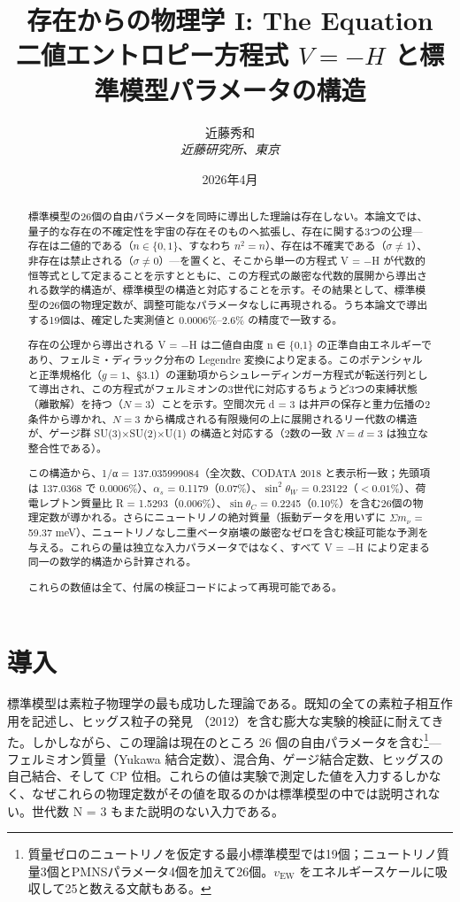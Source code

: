 \documentclass[fontsize=11pt,paper=a4,lualatex]{jlreq}
\title{\textbf{存在からの物理学 I: The Equation}\\[0.45em]{\large 二値エントロピー方程式 $V = -H$ と標準模型パラメータの構造}}
\author{近藤秀和\\[0.5em]\small\textit{近藤研究所、東京}}
\date{2026年4月}
\begin{document}
\maketitle
\begin{abstract}\sloppy\noindent\label{ux6982ux8981}

標準模型の26個の自由パラメータを同時に導出した理論は存在しない。本論文では、量子的な存在の不確定性を宇宙の存在そのものへ拡張し、存在に関する3つの公理---存在は二値的である（$n \in \{0,1\}$、すなわち $n^2{=}n$）、存在は不確実である（$\sigma \neq 1$）、非存在は禁止される（$\sigma \neq 0$）---を置くと、そこから単一の方程式 V = −H が代数的恒等式として定まることを示すとともに、この方程式の厳密な代数的展開から導出される数学的構造が、標準模型の構造と対応することを示す。その結果として、標準模型の26個の物理定数が、調整可能なパラメータなしに再現される。うち本論文で導出する19個は、確定した実測値と 0.0006\%--2.6\% の精度で一致する。

存在の公理から導出される V = −H は二値自由度 n ∈ \{0,1\}
の正準自由エネルギーであり、フェルミ・ディラック分布の Legendre
変換により定まる。このポテンシャルと正準規格化（$g = 1$、\S3.1）の運動項からシュレーディンガー方程式が転送行列として導出され、この方程式がフェルミオンの3世代に対応するちょうど3つの束縛状態（離散解）を持つ（$N = 3$）ことを示す。空間次元
d = 3
は井戸の保存と重力伝播の2条件から導かれ、$N = 3$ から構成される有限幾何の上に展開されるリー代数の構造が、ゲージ群
SU(3)×SU(2)×U(1) の構造と対応する（2数の一致 $N = d = 3$ は独立な整合性である）。

この構造から、1/α = 137.035999084（全次数、CODATA 2018 と表示桁一致；先頭項は 137.0368 で 0.0006\%）、$\alpha_s$ = 0.1179（0.07\%）、$\sin^2\!\theta_W$ = 0.23122（$<0.01$\%）、荷電レプトン質量比 R =
1.5293（0.006\%）、$\sin\theta_C$ = 0.2245（0.10\%）を含む26個の物理定数が導かれる。さらにニュートリノの絶対質量（振動データを用いずに $\Sigma m_\nu$ = 59.37 meV）、ニュートリノなし二重ベータ崩壊の厳密なゼロを含む検証可能な予測を与える。これらの量は独立な入力パラメータではなく、すべて V = −H により定まる同一の数学的構造から計算される。

これらの数値は全て、付属の検証コードによって再現可能である。

\end{abstract}

\section{導入}\label{ux5c0eux5165}

標準模型は素粒子物理学の最も成功した理論である。既知の全ての素粒子相互作用を記述し、ヒッグス粒子の発見 \cite{atlas,cms}（2012）を含む膨大な実験的検証に耐えてきた。しかしながら、この理論は現在のところ 26 個の自由パラメータを含む\footnote{質量ゼロのニュートリノを仮定する最小標準模型では19個；ニュートリノ質量3個とPMNSパラメータ4個を加えて26個。$v_\mathrm{EW}$ をエネルギースケールに吸収して25と数える文献もある。}---フェルミオン質量（Yukawa 結合定数）、混合角、ゲージ結合定数、ヒッグスの自己結合、そして CP 位相。これらの値は実験で測定した値を入力するしかなく、なぜこれらの物理定数がその値を取るのかは標準模型の中では説明されない。世代数 N = 3 もまた説明のない入力である。
\end{document}
